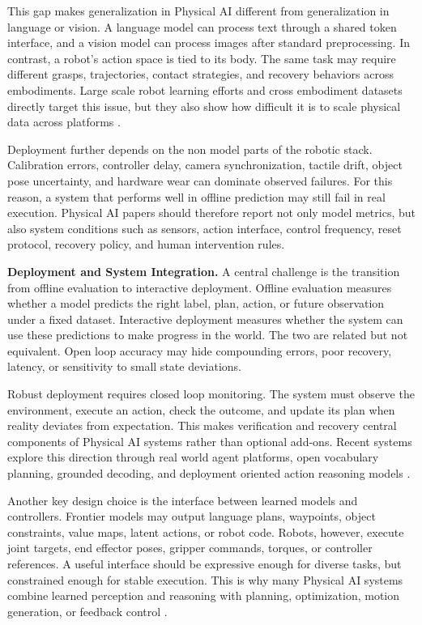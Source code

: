 This gap makes generalization in Physical AI different from generalization in language or vision. 
A language model can process text through a shared token interface, and a vision model can process images after standard preprocessing. 
In contrast, a robot's action space is tied to its body. 
The same task may require different grasps, trajectories, contact strategies, and recovery behaviors across embodiments. 
Large scale robot learning efforts and cross embodiment datasets directly target this issue, but they also show how difficult it is to scale physical data across platforms \citep{brohan2023rt,zitkovich2023rt,o2024open,team2025gemini1,team2025gemini15,liu2023llm}.

Deployment further depends on the non model parts of the robotic stack. 
Calibration errors, controller delay, camera synchronization, tactile drift, object pose uncertainty, and hardware wear can dominate observed failures. 
For this reason, a system that performs well in offline prediction may still fail in real execution. 
Physical AI papers should therefore report not only model metrics, but also system conditions such as sensors, action interface, control frequency, reset protocol, recovery policy, and human intervention rules.

\noindent\textbf{Deployment and System Integration.}
A central challenge is the transition from offline evaluation to interactive deployment. 
Offline evaluation measures whether a model predicts the right label, plan, action, or future observation under a fixed dataset. 
Interactive deployment measures whether the system can use these predictions to make progress in the world. 
The two are related but not equivalent. 
Open loop accuracy may hide compounding errors, poor recovery, latency, or sensitivity to small state deviations.

Robust deployment requires closed loop monitoring. 
The system must observe the environment, execute an action, check the outcome, and update its plan when reality deviates from expectation. 
This makes verification and recovery central components of Physical AI systems rather than optional add-ons. 
Recent systems explore this direction through real world agent platforms, open vocabulary planning, grounded decoding, and deployment oriented action reasoning models \citep{guo2026agenticlab,huang2023grounded,shen2026tiptop,fang2026molmoact2}.

Another key design choice is the interface between learned models and controllers. 
Frontier models may output language plans, waypoints, object constraints, value maps, latent actions, or robot code. 
Robots, however, execute joint targets, end effector poses, gripper commands, torques, or controller references. 
A useful interface should be expressive enough for diverse tasks, but constrained enough for stable execution. 
This is why many Physical AI systems combine learned perception and reasoning with planning, optimization, motion generation, or feedback control \citep{huang2025rekep,huang2023voxposer,liu2024ok,wu2023tidybot,zhang2024dkprompt}.

